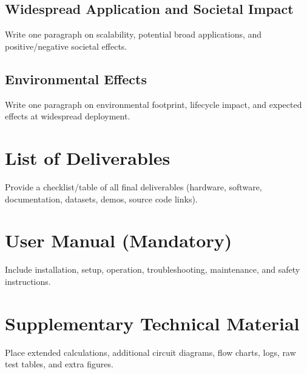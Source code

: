 \documentclass[12pt,a4paper]{report}
\begin{document}
\section{Widespread Application and Societal Impact}
Write one paragraph on scalability, potential broad applications, and positive/negative societal effects.

\section{Environmental Effects}
Write one paragraph on environmental footprint, lifecycle impact, and expected effects at widespread deployment.

\begin{appendices}

\chapter{List of Deliverables}
Provide a checklist/table of all final deliverables (hardware, software, documentation, datasets, demos, source code links).

\chapter{User Manual (Mandatory)}
Include installation, setup, operation, troubleshooting, maintenance, and safety instructions.

\chapter{Supplementary Technical Material}
Place extended calculations, additional circuit diagrams, flow charts, logs, raw test tables, and extra figures.

\end{appendices}
\end{document}
